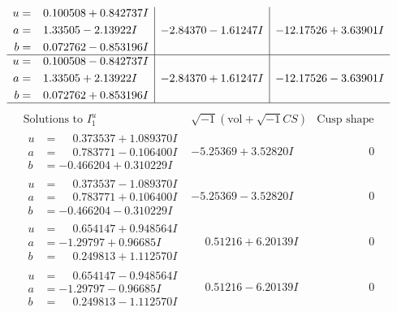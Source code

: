 \documentclass[1p]{elsarticle_modified}
\theoremstyle{definition}
\newcommand{\I}{\sqrt{-1}}
\begin{document}
$$\begin{array}{c|c|c}
\begin{aligned}
u &= \phantom{-}0.100508 + 0.842737 I \\
a &= \phantom{-}1.33505 - 2.13922 I \\
b &= \phantom{-}0.072762 - 0.853196 I\end{aligned}
 & -2.84370 - 1.61247 I & -12.17526 + 3.63901 I \\ \hline\begin{aligned}
u &= \phantom{-}0.100508 - 0.842737 I \\
a &= \phantom{-}1.33505 + 2.13922 I \\
b &= \phantom{-}0.072762 + 0.853196 I\end{aligned}
 & -2.84370 + 1.61247 I & -12.17526 - 3.63901 I\\
 \hline 
 \end{array}$$\newpage$$\begin{array}{c|c|c}  
\text{Solutions to }I^u_{1}& \I (\text{vol} + \sqrt{-1}CS) & \text{Cusp shape}\\
 \hline 
\begin{aligned}
u &= \phantom{-}0.373537 + 1.089370 I \\
a &= \phantom{-}0.783771 - 0.106400 I \\
b &= -0.466204 + 0.310229 I\end{aligned}
 & -5.25369 + 3.52820 I & \phantom{-0.000000 } 0 \\ \hline\begin{aligned}
u &= \phantom{-}0.373537 - 1.089370 I \\
a &= \phantom{-}0.783771 + 0.106400 I \\
b &= -0.466204 - 0.310229 I\end{aligned}
 & -5.25369 - 3.52820 I & \phantom{-0.000000 } 0 \\ \hline\begin{aligned}
u &= \phantom{-}0.654147 + 0.948564 I \\
a &= -1.29797 + 0.96685 I \\
b &= \phantom{-}0.249813 + 1.112570 I\end{aligned}
 & \phantom{-}0.51216 + 6.20139 I & \phantom{-0.000000 } 0 \\ \hline\begin{aligned}
u &= \phantom{-}0.654147 - 0.948564 I \\
a &= -1.29797 - 0.96685 I \\
b &= \phantom{-}0.249813 - 1.112570 I\end{aligned}
 & \phantom{-}0.51216 - 6.20139 I & \phantom{-0.000000 } 0 \\ \hline\begin{aligned}

\end{aligned}
\end{array}$$
\end{document}
